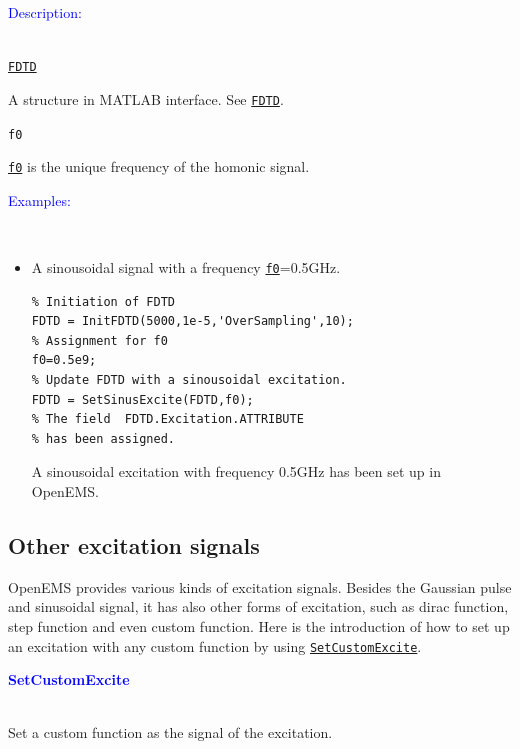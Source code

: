 \textcolor{blue}{\begin{large}Description:\end{large}}\\
	\hyperref[para:FDTD]{\texttt{FDTD}} 
	    \begin{myindentpar}
		A structure in MATLAB interface. See \hyperref[para:FDTD]{\texttt{FDTD}}.
	    \end{myindentpar}
	\texttt{f0}   \label{para:sin_f0} %
	    \begin{myindentpar}
		\hyperref[para:sin_f0]{\texttt{f0}}  is the unique frequency of the homonic signal. 
	    \end{myindentpar}

	\textcolor{blue}{\begin{large}Examples:\end{large}}\\
\begin{itemize}
\item A sinousoidal signal with a  frequency \hyperref[para:sin_f0]{\texttt{f0}}=0.5GHz. 
\begin{lstlisting}
% Initiation of FDTD 
FDTD = InitFDTD(5000,1e-5,'OverSampling',10);
% Assignment for f0
f0=0.5e9;
% Update FDTD with a sinousoidal excitation. 
FDTD = SetSinusExcite(FDTD,f0);
% The field  FDTD.Excitation.ATTRIBUTE
% has been assigned.
\end{lstlisting}
A sinousoidal excitation with frequency 0.5GHz has been set up in OpenEMS. 
\end{itemize}

    \subsection{Other excitation signals}\label{subsec:Other excitation signals}
OpenEMS provides various kinds of excitation signals. Besides the Gaussian pulse and sinusoidal signal, it has also other forms of excitation, such as dirac function, step function and even custom function. Here is the introduction of how to set up an excitation with any custom function by using \hyperref[func:SetCustomExcite]{\texttt{SetCustomExcite}}.

\textcolor{blue}{\begin{large}\textbf{SetCustomExcite}	\end{large}} \label{func:SetCustomExcite}\\
	  Set a custom function as the signal of the excitation.

